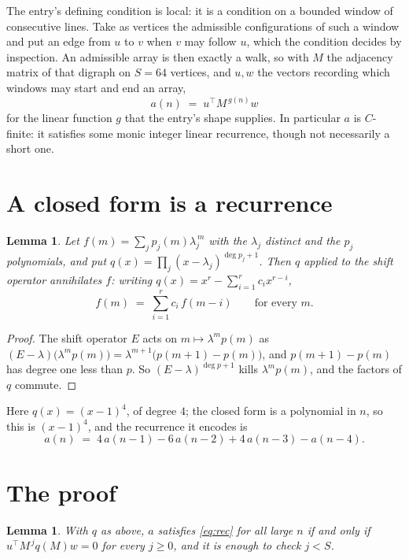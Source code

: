 \documentclass[11pt,a4paper]{article}
\theoremstyle{plain}
\newtheorem{lemma}[theorem]{Lemma}
\theoremstyle{definition}
\begin{document}
The entry's defining condition is local: it is a condition on a bounded window of consecutive lines. Take as vertices the
admissible configurations of such a window and put an edge from $u$ to $v$ when $v$ may
follow $u$, which the condition decides by inspection. An admissible array is then exactly a
walk, so with $M$ the adjacency matrix of that digraph on $S=64$ vertices, and $u,w$ the
vectors recording which windows may start and end an array,
\[
a(n)\;=\;u^{\!\top}M^{\,g(n)}w
\]
for the linear function $g$ that the entry's shape supplies. In particular $a$ is
$C$-finite: it satisfies some monic integer linear recurrence, though not necessarily a short
one.

\section{A closed form is a recurrence}

\begin{lemma}\label{lem:ann}
Let $f(m)=\sum_{j}p_j(m)\lambda_j^{\,m}$ with the $\lambda_j$ distinct and the $p_j$
polynomials, and put $q(x)=\prod_j(x-\lambda_j)^{\deg p_j+1}$. Then $q$ applied to the shift
operator annihilates $f$: writing $q(x)=x^{r}-\sum_{i=1}^{r}c_ix^{r-i}$,
\[
f(m)\;=\;\sum_{i=1}^{r}c_i\,f(m-i)\qquad\text{for every }m.
\]
\end{lemma}

\begin{proof}
The shift operator $E$ acts on $m\mapsto\lambda^{m}p(m)$ as
$(E-\lambda)\bigl(\lambda^{m}p(m)\bigr)=\lambda^{m+1}\bigl(p(m+1)-p(m)\bigr)$, and
$p(m+1)-p(m)$ has degree one less than $p$. So $(E-\lambda)^{\deg p+1}$ kills
$\lambda^{m}p(m)$, and the factors of $q$ commute.
\end{proof}

Here $q(x)=(x-1)^{4}$, of degree $4$; the closed form is a polynomial in $n$, so this is $(x-1)^{4}$, and the recurrence it encodes is
\begin{equation}\label{eq:rec}
a(n)\;=\;4\,a(n-1) - 6\,a(n-2) + 4\,a(n-3) - a(n-4).
\end{equation}

\section{The proof}

\begin{lemma}\label{lem:crit}
With $q$ as above, $a$ satisfies \eqref{eq:rec} for all large $n$ if and only if
$u^{\!\top}M^{\,j}q(M)w=0$ for every $j\ge0$, and it is enough to check $j<S$.
\end{lemma}
\end{document}
